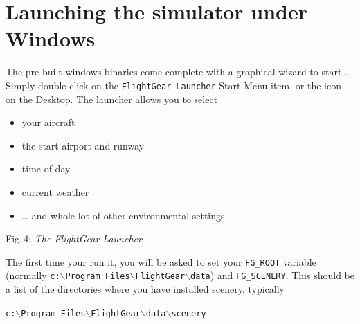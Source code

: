 \section{Launching the simulator under Windows}
The pre-built windows binaries come complete with a graphical wizard to start \FlightGear{}. Simply double-click on the \texttt{FlightGear Launcher} Start Menu item, or the icon on the Desktop. The launcher allows you to select
\begin{itemize}
\item your aircraft
\item the start airport and runway
\item time of day
\item current weather
\item \dots{} and whole lot of other environmental settings
\end{itemize}

 \centerline{}
\smallskip
\noindent
Fig.\,4: \textit{The FlightGear Launcher}

\medskip

The first time your run it, you will be asked to set your \texttt{FG\_ROOT} variable 
(normally \texttt{c:$\backslash$Program Files$\backslash$FlightGear$\backslash$data}) and \texttt{FG\_SCENERY}. 
This should be a list of the directories where you have installed scenery, typically 

\medskip
\texttt{c:$\backslash$Program Files$\backslash$FlightGear$\backslash$data$\backslash$scenery} 
\medskip

